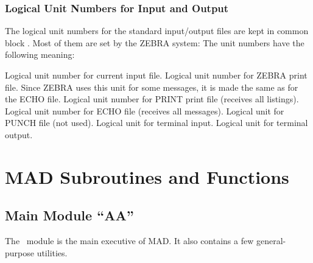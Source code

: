 \section{Logical Unit Numbers for Input and Output}
\label{Sunit}
The logical unit numbers for the standard input/output files are
kept in common block .
Most of them are set by the ZEBRA system:
The unit numbers have the following meaning:
\begin{mylist}
Logical unit number for current input file.
Logical unit number for ZEBRA print file.
Since ZEBRA uses this unit for some messages, it is made the same
as for the ECHO file.
Logical unit number for PRINT print file (receives all listings).
Logical unit number for ECHO file (receives all messages).
Logical unit for PUNCH file (not used).
Logical unit for terminal input.
Logical unit for terminal output.
\end{mylist}


\part{MAD Subroutines and Functions}


\chapter{Main Module ``AA''}
\label{AA}
The ~module is the main executive of MAD.
It also contains a few general-purpose utilities.

